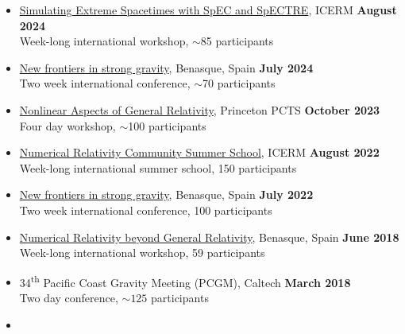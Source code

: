 \documentclass[margin,line]{res}
\begin{document}
\begin{resume}
\begin{itemize}
  {11\textsuperscript{th} Gulf Coast Gravity Meeting (GCGM)},
UMiss
\hfill {\bf April 2025}\\
\hspace*{1em} Two day conference, $\sim 50$ participants
\item[]
  \href{https://icerm.brown.edu/topical_workshops/tw-24-ses/}
  {Simulating Extreme Spacetimes with SpEC and SpECTRE},
  ICERM \hfill {\bf August 2024} \\
\hspace*{1em} Week-long international workshop, $\sim$85 participants
\item[]
  \href{https://www.benasque.org/2024relativity/}
  {New frontiers in strong gravity},
  Benasque, Spain \hfill {\bf July 2024} \\
\hspace*{1em} Two week international conference, $\sim$70 participants
\item[]
  \href{https://pcts.princeton.edu/events/2023/nonlinear-aspects-general-relativity}
  {Nonlinear Aspects of General Relativity},
  Princeton PCTS \hfill {\bf October 2023}\\
\hspace*{1em} Four day workshop, $\sim$100 participants
\item[]
  \href{https://icerm.brown.edu/events/re-22-f20w1/}
  {Numerical Relativity Community Summer School},
  ICERM \hfill {\bf August 2022} \\
\hspace*{1em} Week-long international summer school, 150 participants
\item[]
  \href{https://www.benasque.org/2022relativity/}
  {New frontiers in strong gravity},
  Benasque, Spain \hfill {\bf July 2022} \\
\hspace*{1em} Two week international conference, 100 participants
\item[]
  \href{http://www.benasque.org/2018relativity/}
  {Numerical Relativity beyond General Relativity},
  Benasque, Spain \hfill {\bf June 2018} \\
\hspace*{1em} Week-long international workshop, 59 participants
\item[]
34\textsuperscript{th} Pacific Coast Gravity Meeting (PCGM),
Caltech
\hfill {\bf March 2018}\\
\hspace*{1em} Two day conference, $\sim 125$ participants
\item[]

\end{itemize}
\end{resume}
\end{document}
